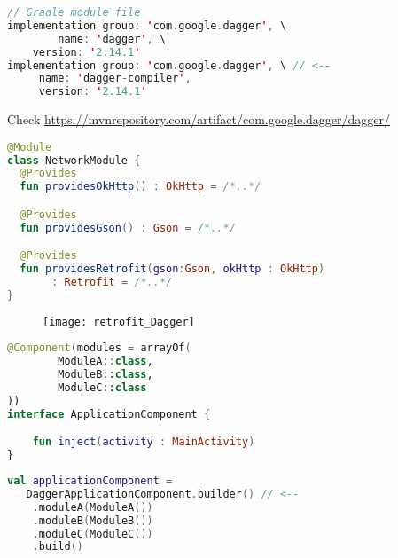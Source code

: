 \documentclass[10pt]{beamer}
\begin{document}
	\begin{frame}[fragile]
\begin{lstlisting}[language=Kotlin, basicstyle=\ttfamily]
// Gradle module file 
implementation group: 'com.google.dagger', \
        name: 'dagger', \
	version: '2.14.1'
implementation group: 'com.google.dagger', \ // <-- 
     name: 'dagger-compiler', 
     version: '2.14.1'
\end{lstlisting} 
Check 
		\url{https://mvnrepository.com/artifact/com.google.dagger/dagger/}
\end{frame}


	\begin{frame}[fragile]
\begin{lstlisting}[language=Kotlin, basicstyle=\ttfamily]
@Module
class NetworkModule {
  @Provides
  fun providesOkHttp() : OkHttp = /*..*/

  @Provides
  fun providesGson() : Gson = /*..*/

  @Provides 
  fun providesRetrofit(gson:Gson, okHttp : OkHttp) 
       : Retrofit = /*..*/
}
\end{lstlisting} 
\end{frame}

\begin{frame}[fragile]
	\begin{figure}
		\centering
		\texttt{[image: retrofit\_Dagger]}
	\end{figure}
\end{frame}

	\begin{frame}[fragile]
\begin{lstlisting}[language=Kotlin, basicstyle=\ttfamily]
@Component(modules = arrayOf(
        ModuleA::class,
        ModuleB::class,
        ModuleC::class
))
interface ApplicationComponent {

	fun inject(activity : MainActivity)
}

\end{lstlisting} 
\end{frame}
	\begin{frame}[fragile]
\begin{lstlisting}[language=Kotlin, basicstyle=\ttfamily]
val applicationComponent = 
   DaggerApplicationComponent.builder() // <--
    .moduleA(ModuleA())
    .moduleB(ModuleB())
    .moduleC(ModuleC())
    .build()
\end{lstlisting} 
\end{frame}
\end{document}

